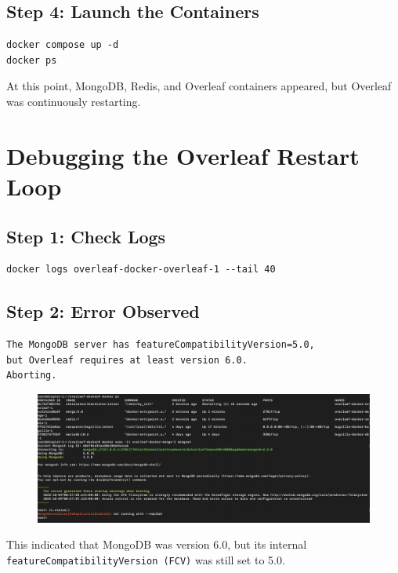 \subsection{Step 4: Launch the Containers}
\begin{verbatim}
docker compose up -d
docker ps
\end{verbatim}

At this point, MongoDB, Redis, and Overleaf containers appeared, but Overleaf was continuously restarting.

\section{Debugging the Overleaf Restart Loop}

\subsection{Step 1: Check Logs}
\begin{verbatim}
docker logs overleaf-docker-overleaf-1 --tail 40
\end{verbatim}

\subsection{Step 2: Error Observed}
\begin{verbatim}
The MongoDB server has featureCompatibilityVersion=5.0,
but Overleaf requires at least version 6.0.
Aborting.
\end{verbatim}

\begin{figure}
    \centering
    \includegraphics[width=1.0\linewidth]{png/restarting_problem_overleaf.png}
\end{figure}

This indicated that MongoDB was version 6.0, but its internal
\texttt{featureCompatibilityVersion (FCV)} was still set to 5.0.

